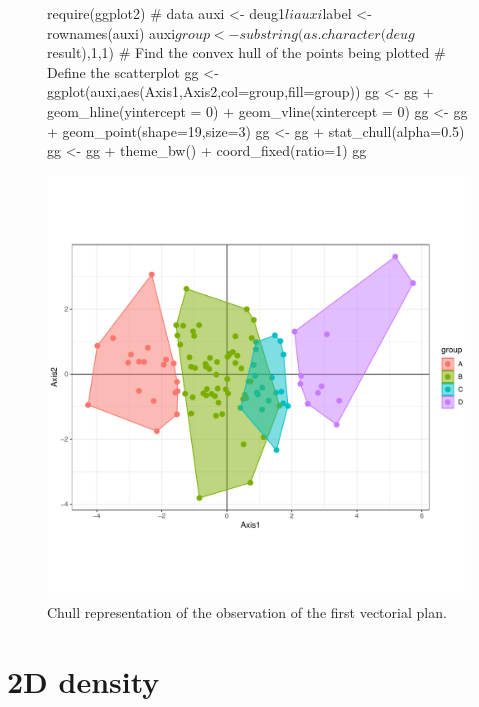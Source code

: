 \documentclass[a4paper,10pt]{article}
\begin{document}
\begin{figure}[H]
\begin{center}
\begin{Schunk}
\begin{Sinput}
  require(ggplot2)
  # data 
  auxi <- deug1$li
  auxi$label <- rownames(auxi)
  auxi$group <- substring(as.character(deug$result),1,1)
  # Find the convex hull of the points being plotted
  # Define the scatterplot
  gg <- ggplot(auxi,aes(Axis1,Axis2,col=group,fill=group))
  gg <- gg + geom_hline(yintercept = 0) + geom_vline(xintercept = 0)
  gg <- gg + geom_point(shape=19,size=3)
  gg <- gg + stat_chull(alpha=0.5)
  gg <-  gg + theme_bw() + coord_fixed(ratio=1)
  gg
\end{Sinput}
\end{Schunk}
\includegraphics{figs/sweave-lichull2}
\caption{Chull representation of the observation of the first vectorial plan.}
\label{fig:lichull2}
\end{center}
\end{figure}



\section{2D density}
\end{document}
